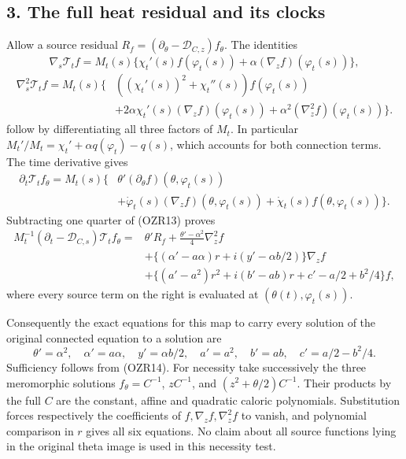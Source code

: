 \documentclass[
  10pt,
  a4paper,
]{article}
\begin{document}
\subsection{3. The full heat residual and its
clocks}\label{the-full-heat-residual-and-its-clocks}

Allow a source residual
\(R_f=(\partial_\theta-\mathcal D_{C,z})f_\theta\). The identities \[
\nabla_s\mathcal T_t f
=M_t(s)\{\chi_t'(s)f(\varphi_t(s))
+\alpha(\nabla_z f)(\varphi_t(s))\},
\] \[
\begin{aligned}
\nabla_s^2\mathcal T_t f=M_t(s)\{&((\chi_t'(s))^2+\chi_t''(s))f(\varphi_t(s))\\
 &+2\alpha\chi_t'(s)(\nabla_z f)(\varphi_t(s))
 +\alpha^2(\nabla_z^2f)(\varphi_t(s))\}.
\end{aligned}
\tag{OZR13}
\] follow by differentiating all three factors of \(M_t\). In particular
\(M_t'/M_t=\chi_t'+\alpha q(\varphi_t)-q(s)\), which accounts for both
connection terms. The time derivative gives \[
\begin{aligned}
\partial_t\mathcal T_t f_\theta=M_t(s)\{&\theta'(\partial_\theta f)(\theta,\varphi_t(s))\\
 &+\dot\varphi_t(s)(\nabla_z f)(\theta,\varphi_t(s))
 +\dot\chi_t(s)f(\theta,\varphi_t(s))\}.
\end{aligned}
\] Subtracting one quarter of (OZR13) proves \[
\begin{aligned}
M_t^{-1}(\partial_t-\mathcal D_{C,s})\mathcal T_t f_\theta
={}&\theta'R_f
 +\frac{\theta'-\alpha^2}{4}\nabla_z^2 f\\
&+\{(\alpha'-a\alpha)r+i(y'-\alpha b/2)\}\nabla_z f\\
&+\{(a'-a^2)r^2+i(b'-ab)r+c'-a/2+b^2/4\}f,
\end{aligned}\tag{OZR14}
\] where every source term on the right is evaluated at
\((\theta(t),\varphi_t(s))\).

Consequently the exact equations for this map to carry every solution of
the original connected equation to a solution are \[
\theta'=\alpha^2,\quad \alpha'=a\alpha,\quad y'=\alpha b/2,
\quad a'=a^2,\quad b'=ab,\quad c'=a/2-b^2/4.
\tag{OZR15}
\] Sufficiency follows from (OZR14). For necessity take successively the
three meromorphic solutions \(f_\theta=C^{-1}\), \(zC^{-1}\), and
\((z^2+\theta/2)C^{-1}\). Their products by the full \(C\) are the
constant, affine and quadratic caloric polynomials. Substitution forces
respectively the coefficients of \(f,\nabla_z f,\nabla_z^2 f\) to
vanish, and polynomial comparison in \(r\) gives all six equations. No
claim about all source functions lying in the original theta image is
used in this necessity test.
\end{document}
